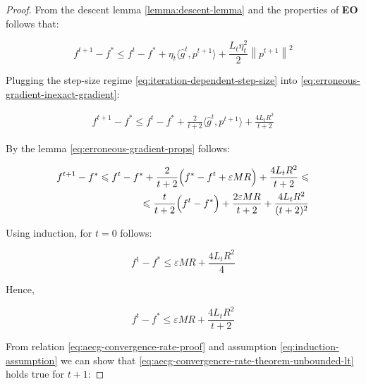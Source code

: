 \documentclass[runningheads, draft]{llncs}
\newcommand{\norm}[1]{\left\lVert#1\right\rVert}
\newcommand{\vprod}[1]{\langle#1\rangle}
\newcommand{\errgrad}{\hat{g}}
\begin{document}
\begin{proof}
    From the descent lemma \eqref{lemma:descent-lemma} and
    the properties of \textbf{EO} follows that:

    \begin{equation}\label{eq:erroneous-gradient-inexact-gradient}
        f^{t+1} - f^* \leqslant f^t - f^* + \eta_t \vprod{\errgrad^t, p^{t+1}} +
        \frac{L_t \eta_t^2}{2} \norm{p^{t+1}}^2
    \end{equation}

    Plugging the step-size regime \eqref{eq:iteration-dependent-step-size} into
    \eqref{eq:erroneous-gradient-inexact-gradient}:

    \begin{equation}
        \begin{split}
            f^{t+1} - f^* \leqslant f^t - f^* + \frac{2}{t+2}
            \vprod{\errgrad^t, p^{t+1}} + \frac{4 L_t R^2}{t + 2}
        \end{split}
    \end{equation}

    By the lemma \eqref{eq:erroneous-gradient-props} follows:

    \begin{equation}\label{eq:aecg-convergence-rate-proof}
        \begin{split}
            f^{t+1} - f^* \leqslant f^t - f^* + \frac{2}{t+2}
            \Bigl(f^* - f^t + \varepsilon M R\Bigr) +
            \frac{4 L_t R^2}{t + 2} \leqslant \\
            \leqslant \frac{t}{t + 2}\Bigl(f^t - f^*\Bigr)+
            \frac{2 \varepsilon M R}{t + 2} + \frac{4 L_t R^2}{(t + 2)^2}
        \end{split}
    \end{equation}

    Using induction, for $t = 0$ follows:

    \begin{equation}
        f^1 - f^* \leqslant \varepsilon M R + \frac{4 L_t R^2}{4}
    \end{equation}

    Hence,

    \begin{equation}\label{eq:induction-assumption}
        f^t - f^* \leqslant \varepsilon M R + \frac{4 L_t R^2}{t + 2}
    \end{equation}

    From relation \eqref{eq:aecg-convergence-rate-proof} and assumption
    \eqref{eq:induction-assumption} we can show that
    \eqref{eq:aecg-convergencre-rate-theorem-unbounded-lt} holds true for $t + 1$:


\end{proof}
\end{document}
